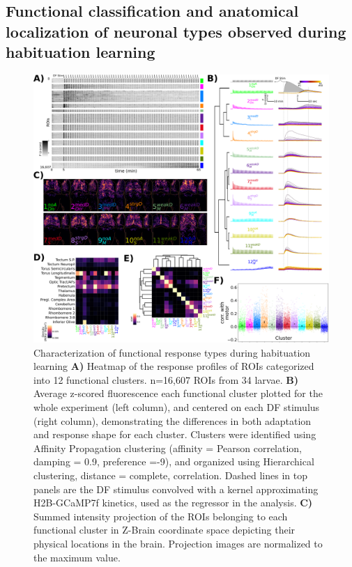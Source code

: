 \documentclass[9pt,lineno]{RandlettLab_elife}
\begin{document}
\subsection{Functional classification and anatomical localization of neuronal types observed during habituation learning}

\begin{figure}
\begin{fullwidth}
\begin{center}
\includegraphics[width=0.95\linewidth]{Figure6 - Clustering.png}
\caption{
Characterization of functional response types during habituation learning 
\textbf{A)} Heatmap of the response profiles of ROIs categorized into 12 functional clusters. n=16,607 ROIs from 34 larvae. 
\textbf{B)} Average z-scored fluorescence each functional cluster plotted for the whole experiment (left column), and centered on each DF stimulus (right column), demonstrating the differences in both adaptation and response shape for each cluster. Clusters were identified using Affinity Propagation clustering (affinity = Pearson correlation, damping = 0.9, preference =-9), and organized using Hierarchical clustering, distance = complete, correlation. Dashed lines in top panels are the DF stimulus convolved with a kernel approximating H2B-GCaMP7f kinetics, used as the regressor in the analysis. 
\textbf{C)} Summed intensity projection of the ROIs belonging to each functional cluster in Z-Brain coordinate space depicting their physical locations in the brain. Projection images are normalized to the maximum value. 
}
\end{center}
\end{fullwidth}
\end{figure}
\end{document}
